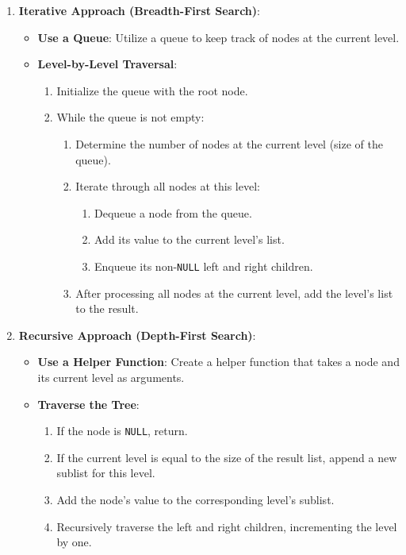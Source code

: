 \begin{enumerate}
    \item \textbf{Iterative Approach (Breadth-First Search)}:
    \begin{itemize}
        \item \textbf{Use a Queue}: Utilize a queue to keep track of nodes at the current level.
        \item \textbf{Level-by-Level Traversal}:
        \begin{enumerate}
            \item Initialize the queue with the root node.
            \item While the queue is not empty:
            \begin{enumerate}
                \item Determine the number of nodes at the current level (size of the queue).
                \item Iterate through all nodes at this level:
                \begin{enumerate}
                    \item Dequeue a node from the queue.
                    \item Add its value to the current level's list.
                    \item Enqueue its non-\texttt{NULL} left and right children.
                \end{enumerate}
                \item After processing all nodes at the current level, add the level's list to the result.
            \end{enumerate}
        \end{enumerate}
    \end{itemize}
    
    \item \textbf{Recursive Approach (Depth-First Search)}:
    \begin{itemize}
        \item \textbf{Use a Helper Function}: Create a helper function that takes a node and its current level as arguments.
        \item \textbf{Traverse the Tree}:
        \begin{enumerate}
            \item If the node is \texttt{NULL}, return.
            \item If the current level is equal to the size of the result list, append a new sublist for this level.
            \item Add the node's value to the corresponding level's sublist.
            \item Recursively traverse the left and right children, incrementing the level by one.
        \end{enumerate}
    \end{itemize}
\end{enumerate}

